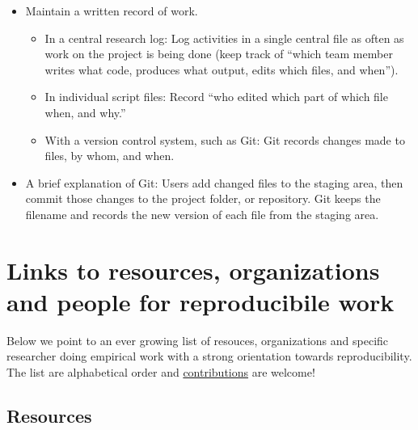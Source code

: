 \documentclass[]{book}
\providecommand{\tightlist}{%
  \setlength{\itemsep}{0pt}\setlength{\parskip}{0pt}}
\begin{document}
\begin{itemize}
\tightlist
\item
  Maintain a written record of work.

  \begin{itemize}
  \tightlist
  \item
    In a central research log: Log activities in a single central file as often as work on the project is being done (keep track of ``which team member writes what code, produces what output, edits which files, and when'').
  \item
    In individual script files: Record ``who edited which part of which file when, and why.''
  \item
    With a version control system, such as Git: Git records changes made to files, by whom, and when.
  \end{itemize}
\item
  A brief explanation of Git: Users add changed files to the staging area, then commit those changes to the project folder, or repository. Git keeps the filename and records the new version of each file from the staging area.
\end{itemize}

\hypertarget{links-to-resources-organizations-and-people-for-reproducibile-work}{%
\section{Links to resources, organizations and people for reproducibile work}\label{links-to-resources-organizations-and-people-for-reproducibile-work}}

Below we point to an ever growing list of resouces, organizations and specific researcher doing empirical work with a strong orientation towards reproducibility. The list are alphabetical order and \protect\hyperlink{contrib-guide}{contributions} are welcome!

\hypertarget{resources}{%
\subsection{Resources}\label{resources}}
\end{document}
